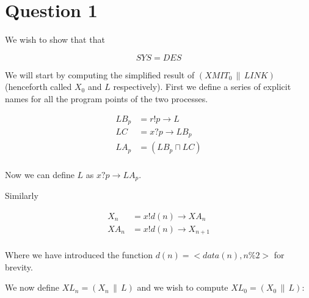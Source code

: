 \documentclass[a4paper, 10pt]{article}
\newcommand{\conc}{\, \| \,}
\begin{document}
\maketitle
\newpage
\tableofcontents
\newpage

\section{Question 1}

We wish to show that that

\begin{equation*}
  SYS = DES
\end{equation*}

We will start by computing the simplified result of $(XMIT_0 \conc
LINK)$ (henceforth called $X_0$ and $L$ respectively). First we define a
series of explicit names for all the program points of the two
processes.

\begin{align*}
  LB_p &= r!p \to L \\
  LC &= x?p \to LB_p \\
  LA_p &= (LB_p \sqcap LC) \\
\end{align*}

Now we can define $L$ as $x?p \to LA_p$.

Similarly

\begin{align*}
  X_n &= x!d(n) \to XA_n \\
  XA_n &= x!d(n) \to X_{n+1} \\
\end{align*}

Where we have introduced the function $d(n) = <data(n), n \% 2>$ for
brevity.

We now define $XL_n = (X_n \conc L)$ and we wish to compute $XL_0 = (X_0 \conc L)$:
\end{document}
